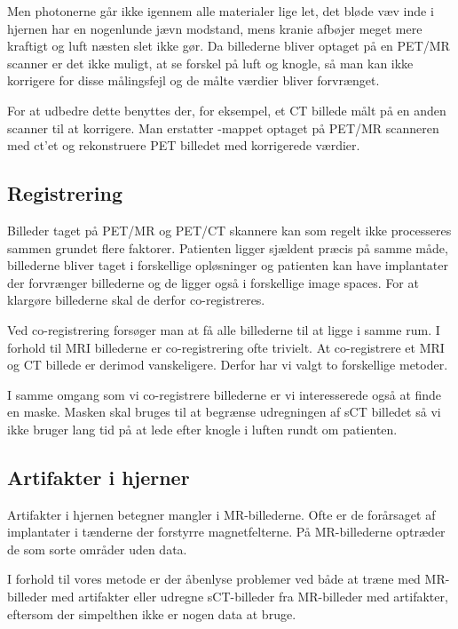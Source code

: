 Men photonerne går ikke igennem alle materialer lige let, det bløde væv
inde i hjernen har en nogenlunde jævn modstand, mens kranie afbøjer meget
mere kraftigt og luft næsten slet ikke gør. Da billederne bliver optaget
på en PET/MR scanner er det ikke muligt, at se forskel på luft og knogle,
så man kan ikke korrigere for disse målingsfejl og de målte værdier bliver
forvrænget.

For at udbedre dette benyttes der, for eksempel, et CT billede målt på en anden
scanner til at korrigere. Man erstatter \mu-mappet optaget på PET/MR scanneren
med ct'et og rekonstruere PET billedet med korrigerede værdier.



\subsection{Registrering}


Billeder taget på PET/MR og PET/CT skannere kan som regelt ikke processeres
sammen grundet flere faktorer. Patienten ligger sjældent præcis på samme
måde, billederne bliver taget i forskellige opløsninger og patienten kan have
implantater der forvrænger billederne og de ligger også i forskellige image
spaces. For at klargøre billederne skal de derfor co-registreres.

Ved co-registrering forsøger man at få alle billederne til at ligge i samme
rum. I forhold til MRI billederne er co-registrering ofte trivielt. At
co-registrere et MRI og CT billede er derimod vanskeligere. Derfor har vi valgt
to forskellige metoder.



I samme omgang som vi co-registrere billederne er vi interesserede også
at finde en maske. Masken skal bruges til at begrænse udregningen af sCT
billedet så vi ikke bruger lang tid på at lede efter knogle i luften rundt om
patienten.


\subsection{Artifakter i hjerner}
Artifakter i hjernen betegner mangler i MR-billederne. Ofte er de forårsaget
af implantater i tænderne der forstyrre magnetfelterne. På MR-billederne optræder
de som sorte områder uden data.

I forhold til vores metode er der åbenlyse problemer ved både at træne med MR-billeder
med artifakter eller udregne sCT-billeder fra MR-billeder med artifakter, eftersom der
simpelthen ikke er nogen data at bruge.

